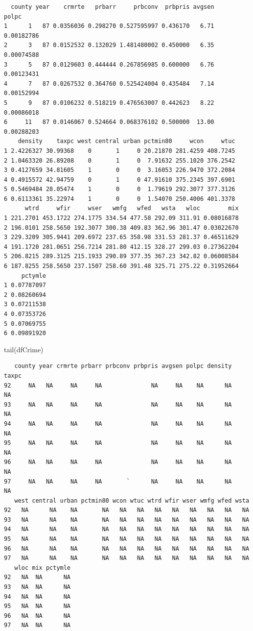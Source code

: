 \documentclass[]{article}
\newenvironment{Shaded}{}{}
\newcommand{\KeywordTok}[1]{\textcolor[rgb]{0.00,0.00,1.00}{#1}}
\newcommand{\NormalTok}[1]{#1}
\begin{document}
\begin{verbatim}
  county year    crmrte   prbarr     prbconv  prbpris avgsen      polpc
1      1   87 0.0356036 0.298270 0.527595997 0.436170   6.71 0.00182786
2      3   87 0.0152532 0.132029 1.481480002 0.450000   6.35 0.00074588
3      5   87 0.0129603 0.444444 0.267856985 0.600000   6.76 0.00123431
4      7   87 0.0267532 0.364760 0.525424004 0.435484   7.14 0.00152994
5      9   87 0.0106232 0.518219 0.476563007 0.442623   8.22 0.00086018
6     11   87 0.0146067 0.524664 0.068376102 0.500000  13.00 0.00288203
    density    taxpc west central urban pctmin80     wcon     wtuc
1 2.4226327 30.99368    0       1     0 20.21870 281.4259 408.7245
2 1.0463320 26.89208    0       1     0  7.91632 255.1020 376.2542
3 0.4127659 34.81605    1       0     0  3.16053 226.9470 372.2084
4 0.4915572 42.94759    0       1     0 47.91610 375.2345 397.6901
5 0.5469484 28.05474    1       0     0  1.79619 292.3077 377.3126
6 0.6113361 35.22974    1       0     0  1.54070 250.4006 401.3378
      wtrd     wfir     wser   wmfg   wfed   wsta   wloc        mix
1 221.2701 453.1722 274.1775 334.54 477.58 292.09 311.91 0.08016878
2 196.0101 258.5650 192.3077 300.38 409.83 362.96 301.47 0.03022670
3 229.3209 305.9441 209.6972 237.65 358.98 331.53 281.37 0.46511629
4 191.1720 281.0651 256.7214 281.80 412.15 328.27 299.03 0.27362204
5 206.8215 289.3125 215.1933 290.89 377.35 367.23 342.82 0.06008584
6 187.8255 258.5650 237.1507 258.60 391.48 325.71 275.22 0.31952664
     pctymle
1 0.07787097
2 0.08260694
3 0.07211538
4 0.07353726
5 0.07069755
6 0.09891920
\end{verbatim}

\begin{Shaded}
\begin{Highlighting}[]
\KeywordTok{tail}\NormalTok{(dfCrime)}
\end{Highlighting}
\end{Shaded}

\begin{verbatim}
   county year crmrte prbarr prbconv prbpris avgsen polpc density taxpc
92     NA   NA     NA     NA              NA     NA    NA      NA    NA
93     NA   NA     NA     NA              NA     NA    NA      NA    NA
94     NA   NA     NA     NA              NA     NA    NA      NA    NA
95     NA   NA     NA     NA              NA     NA    NA      NA    NA
96     NA   NA     NA     NA              NA     NA    NA      NA    NA
97     NA   NA     NA     NA       `      NA     NA    NA      NA    NA
   west central urban pctmin80 wcon wtuc wtrd wfir wser wmfg wfed wsta
92   NA      NA    NA       NA   NA   NA   NA   NA   NA   NA   NA   NA
93   NA      NA    NA       NA   NA   NA   NA   NA   NA   NA   NA   NA
94   NA      NA    NA       NA   NA   NA   NA   NA   NA   NA   NA   NA
95   NA      NA    NA       NA   NA   NA   NA   NA   NA   NA   NA   NA
96   NA      NA    NA       NA   NA   NA   NA   NA   NA   NA   NA   NA
97   NA      NA    NA       NA   NA   NA   NA   NA   NA   NA   NA   NA
   wloc mix pctymle
92   NA  NA      NA
93   NA  NA      NA
94   NA  NA      NA
95   NA  NA      NA
96   NA  NA      NA
97   NA  NA      NA
\end{verbatim}
\end{document}
